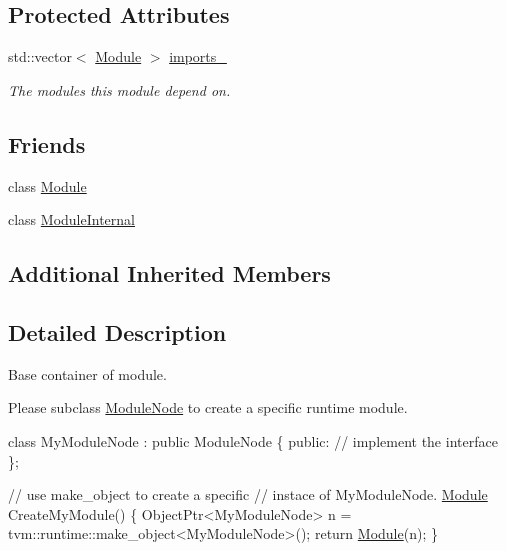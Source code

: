 \subsection*{Protected Attributes}
\begin{DoxyCompactItemize}
\item 
std\+::vector$<$ \hyperlink{classtvm_1_1runtime_1_1Module}{Module} $>$ \hyperlink{classtvm_1_1runtime_1_1ModuleNode_af05db5c6d76f9b4dbf0631815170c5a7}{imports\+\_\+}
\begin{DoxyCompactList}\small\item\em The modules this module depend on. \end{DoxyCompactList}\end{DoxyCompactItemize}
\subsection*{Friends}
\begin{DoxyCompactItemize}
\item 
class \hyperlink{classtvm_1_1runtime_1_1ModuleNode_a21f639900c480510650969df9c74d17d}{Module}
\item 
class \hyperlink{classtvm_1_1runtime_1_1ModuleNode_a2b490c1acecd166b5824e4e96f17c64e}{Module\+Internal}
\end{DoxyCompactItemize}
\subsection*{Additional Inherited Members}


\subsection{Detailed Description}
Base container of module. 

Please subclass \hyperlink{classtvm_1_1runtime_1_1ModuleNode}{Module\+Node} to create a specific runtime module.


\begin{DoxyCode}
\textcolor{keyword}{class }MyModuleNode : \textcolor{keyword}{public} ModuleNode \{
 \textcolor{keyword}{public}:
  \textcolor{comment}{// implement the interface}
\};

\textcolor{comment}{// use make\_object to create a specific}
\textcolor{comment}{// instace of MyModuleNode.}
\hyperlink{classtvm_1_1runtime_1_1ModuleNode_a21f639900c480510650969df9c74d17d}{Module} CreateMyModule() \{
  ObjectPtr<MyModuleNode> n =
    tvm::runtime::make\_object<MyModuleNode>();
  \textcolor{keywordflow}{return} \hyperlink{classtvm_1_1runtime_1_1ModuleNode_a21f639900c480510650969df9c74d17d}{Module}(n);
\}
\end{DoxyCode}
 

